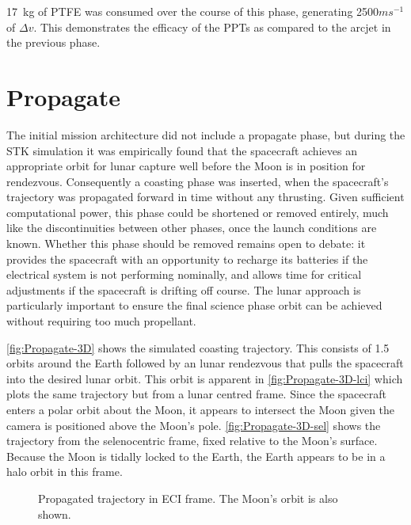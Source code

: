 17~kg of PTFE was consumed over the course of this phase, generating 2500$ms^{-1}$ of $\Delta v$. %
This demonstrates the efficacy of the PPTs as compared to the arcjet in the previous phase.


\clearpage 

\section{Propagate} \label{sec:Propagate}

The initial mission architecture did not include a propagate phase, but during the STK simulation it was empirically found that the spacecraft achieves an appropriate orbit for lunar capture well before the Moon is in position for rendezvous. Consequently a coasting phase was inserted, when the spacecraft's trajectory was propagated forward in time without any thrusting. Given sufficient computational power, this phase could be shortened or removed entirely, much like the discontinuities between other phases, once the launch conditions are known. Whether this phase should be removed remains open to debate: it provides the spacecraft with an opportunity to recharge its batteries if the electrical system is not performing nominally, and allows time for critical adjustments if the spacecraft is drifting off course. The lunar approach is particularly important to ensure the final science phase orbit can be achieved without requiring too much propellant.

\autoref{fig:Propagate-3D} shows the simulated coasting trajectory. This consists of 1.5 orbits around the Earth followed by an lunar rendezvous that pulls the spacecraft into the desired lunar orbit. This orbit is apparent in \autoref{fig:Propagate-3D-lci} which plots the same trajectory but from a lunar centred frame. Since the spacecraft enters a polar orbit about the Moon, it appears to intersect the Moon given the camera is positioned above the Moon's pole. \autoref{fig:Propagate-3D-sel} shows the trajectory from the selenocentric frame, fixed relative to the Moon's surface. Because the Moon is tidally locked to the Earth, the Earth appears to be in a halo orbit in this frame.

\begin{figure}
\centering
\def\svgwidth{\figurewidth}

\caption{Propagated trajectory in ECI frame. The Moon's orbit is also shown.}
\label{fig:Propagate-3D}
\end{figure}

